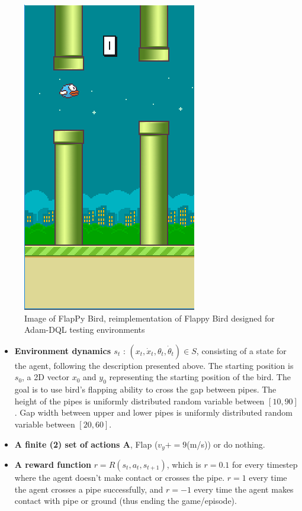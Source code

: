      \begin{figure}[H]
        \centering
        \includegraphics[scale=0.5]{images/flappy.png}
        \caption{Image of FlapPy Bird, reimplementation of Flappy Bird designed for Adam-DQL testing environments}
        \label{fig:52}
    \end{figure}
    
     \begin{itemize}
        \item \textbf{Environment dynamics $s_t$} : $(x_t,\dot{x}_t,\theta_t,\dot{\theta}_t) \in S$, consisting of a state for the agent, following the description presented above. The starting position is $s_0$, a 2D vector $x_0$ and $y_0$ representing the starting position of the bird. The goal is to use bird's flapping ability to cross the gap between pipes. The height of the pipes is uniformly distributed random variable between $[10,90]$. Gap width between upper and lower pipes is uniformly distributed random variable between $[20,60]$.
        \item \textbf{A finite (2) set of actions A}, Flap ($v_y+=9$(m/s)) or do nothing.
        \item \textbf{A reward function} $r=R(s_t,a_t,s_{t+1})$, which is $r=0.1$ for every timestep where the agent doesn't make contact or crosses the pipe. $r=1$ every time the agent crosses a pipe successfully, and $r=-1$ every time the agent makes contact with pipe or ground (thus ending the game/episode).
    \end{itemize}
    
